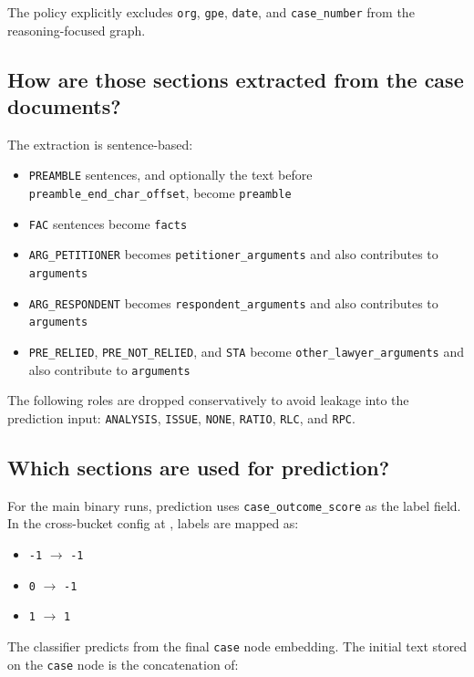 \documentclass[12pt,a4paper]{article}
\begin{document}
The policy explicitly excludes \texttt{org}, \texttt{gpe}, \texttt{date}, and \texttt{case\_number} from the reasoning-focused graph.

\subsection*{How are those sections extracted from the case documents?}

The extraction is sentence-based:

\begin{itemize}[noitemsep]
\item \texttt{PREAMBLE} sentences, and optionally the text before \texttt{preamble\_end\_char\_offset}, become \texttt{preamble}
\item \texttt{FAC} sentences become \texttt{facts}
\item \texttt{ARG\_PETITIONER} becomes \texttt{petitioner\_arguments} and also contributes to \texttt{arguments}
\item \texttt{ARG\_RESPONDENT} becomes \texttt{respondent\_arguments} and also contributes to \texttt{arguments}
\item \texttt{PRE\_RELIED}, \texttt{PRE\_NOT\_RELIED}, and \texttt{STA} become \texttt{other\_lawyer\_arguments} and also contribute to \texttt{arguments}
\end{itemize}

The following roles are dropped conservatively to avoid leakage into the prediction input: \texttt{ANALYSIS}, \texttt{ISSUE}, \texttt{NONE}, \texttt{RATIO}, \texttt{RLC}, and \texttt{RPC}.

\subsection*{Which sections are used for prediction?}

For the main binary runs, prediction uses \texttt{case\_outcome\_score} as the label field. In the cross-bucket config at , labels are mapped as:

\begin{itemize}[noitemsep]
\item \texttt{-1} \(\rightarrow\) \texttt{-1}
\item \texttt{0} \(\rightarrow\) \texttt{-1}
\item \texttt{1} \(\rightarrow\) \texttt{1}
\end{itemize}

The classifier predicts from the final \texttt{case} node embedding. The initial text stored on the \texttt{case} node is the concatenation of:
\end{document}
